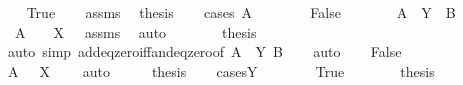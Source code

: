 \begin{isabellebody}
\ \ \isamarkupfalse%
\ True\isanewline
\ \ \isamarkupfalse%
\ assms\ \isamarkupfalse%
\ {\isacharquery}{\kern0pt}thesis\isanewline
\ \ \isamarkupfalse%
\ {\isacharparenleft}{\kern0pt}cases\ {\isachardoublequoteopen}A\ {\isacharequal}{\kern0pt}\ {}{\isachardoublequoteclose}{\isacharparenright}{\kern0pt}\isanewline
\ \ \ \ \isamarkupfalse%
\ False\isanewline
\ \ \ \ \isamarkupfalse%
\ \isamarkupfalse%
\ {\isachardoublequoteopen}A\ {\isacharasterisk}{\kern0pt}\ Y\ {\isacharplus}{\kern0pt}\ B\ {\isacharequal}{\kern0pt}\ {}{\isachardoublequoteclose}\ \isamarkupfalse%
\ \ {\isacartoucheopen}A\ {\isacharequal}{\kern0pt}\ {}\ {\isasymor}\ X\ {\isacharequal}{\kern0pt}\ {}{\isacartoucheclose}\ assms\ \isamarkupfalse%
\ auto\isanewline
\ \ \ \ \isamarkupfalse%
\ \isamarkupfalse%
\ {\isacharquery}{\kern0pt}thesis\isanewline
\ \ \ \ \ \ \isamarkupfalse%
\ {\isacharparenleft}{\kern0pt}auto\ simp{\isacharcolon}{\kern0pt}\ add{\isacharunderscore}{\kern0pt}eq{\isacharunderscore}{\kern0pt}zero{\isacharunderscore}{\kern0pt}iff{\isacharunderscore}{\kern0pt}and{\isacharunderscore}{\kern0pt}eq{\isacharunderscore}{\kern0pt}zero{\isacharbrackleft}{\kern0pt}of\ {\isachardoublequoteopen}A\ {\isacharasterisk}{\kern0pt}\ Y{\isachardoublequoteclose}\ {\isachardoublequoteopen}B{\isachardoublequoteclose}{\isacharbrackright}{\kern0pt}{\isacharparenright}{\kern0pt}\isanewline
\ \ \isamarkupfalse%
\ auto\isanewline
{}\isamarkupfalse%
\isanewline
\ \ \isamarkupfalse%
\ False\isanewline
\ \ \isamarkupfalse%
\ \isamarkupfalse%
\ {\isachardoublequoteopen}A\ {\isasymnoteq}\ {}{\isachardoublequoteclose}\ {\isachardoublequoteopen}X\ {\isasymnoteq}\ {}{\isachardoublequoteclose}\ \isamarkupfalse%
\ auto\isanewline
\ \ \isamarkupfalse%
\ \isamarkupfalse%
\ {\isacharquery}{\kern0pt}thesis\isanewline
\ \ \isamarkupfalse%
\ {\isacharparenleft}{\kern0pt}cases{\isachardoublequoteopen}Y\ {\isacharequal}{\kern0pt}\ {}{\isachardoublequoteclose}{\isacharparenright}{\kern0pt}\isanewline
\ \ \ \ \isamarkupfalse%
\ True\isanewline
\ \ \ \ \isamarkupfalse%
\ \isamarkupfalse%
\ {\isacharquery}{\kern0pt}thesis\ \isamarkupfalse%

\end{isabellebody}
